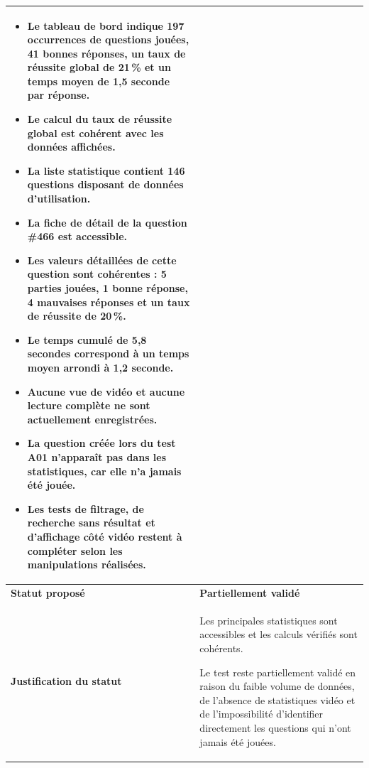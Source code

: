 \begin{longtable}{
    |>{\raggedright\arraybackslash}p{}
    |>{\raggedright\arraybackslash}p{}|
}
\begin{itemize}[leftmargin=*,nosep]
    \item Le tableau de bord indique 197 occurrences de questions jouées,
    41 bonnes réponses, un taux de réussite global de 21\,\% et un temps
    moyen de 1,5 seconde par réponse.

    \item Le calcul du taux de réussite global est cohérent avec les données
    affichées.

    \item La liste statistique contient 146 questions disposant de données
    d'utilisation.

    \item La fiche de détail de la question \#466 est accessible.

    \item Les valeurs détaillées de cette question sont cohérentes :
    5 parties jouées, 1 bonne réponse, 4 mauvaises réponses et un taux de
    réussite de 20\,\%.

    \item Le temps cumulé de 5,8 secondes correspond à un temps moyen arrondi
    à 1,2 seconde.

    \item Aucune vue de vidéo et aucune lecture complète ne sont actuellement
    enregistrées.

    \item La question créée lors du test A01 n'apparaît pas dans les
    statistiques, car elle n'a jamais été jouée.

    \item Les tests de filtrage, de recherche sans résultat et d'affichage
    côté vidéo restent à compléter selon les manipulations réalisées.
\end{itemize}
\\
\hline

\textbf{Statut proposé}
&
\textbf{Partiellement validé}
\\
\hline

\textbf{Justification du statut}
&
Les principales statistiques sont accessibles et les calculs vérifiés sont
cohérents.

Le test reste partiellement validé en raison du faible volume de données,
de l'absence de statistiques vidéo et de l'impossibilité d'identifier
directement les questions qui n'ont jamais été jouées.
\\
\hline



\end{longtable}
